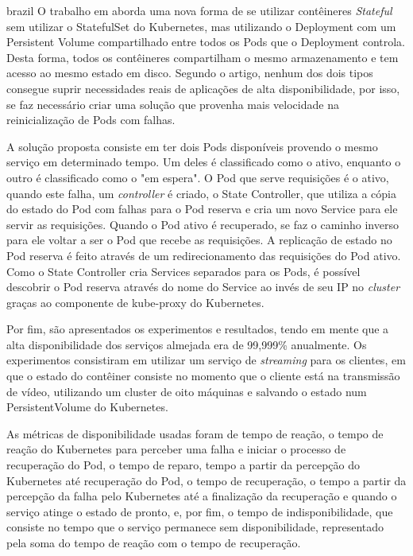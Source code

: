 \begin{otherlanguage*}{brazil}
O trabalho em \cite{vayghan2021kubernetes} aborda uma nova forma de se
utilizar contêineres \textit{Stateful} sem utilizar o StatefulSet do Kubernetes,
mas utilizando o Deployment com um Persistent Volume compartilhado entre todos
os Pods que o Deployment controla. Desta forma, todos os contêineres
compartilham o mesmo armazenamento e tem acesso ao mesmo estado em disco.
Segundo o artigo, nenhum dos dois tipos consegue suprir necessidades reais de
aplicações de alta disponibilidade, por isso, se faz necessário criar uma
solução que provenha mais velocidade na reinicialização de Pods com falhas.

A solução proposta consiste em ter dois Pods disponíveis provendo o mesmo
serviço em determinado tempo. Um deles é classificado como o ativo, enquanto
o outro é classificado como o "em espera". O Pod que serve requisições é o
ativo, quando este falha, um \textit{controller} é criado, o State Controller, que
utiliza a cópia do estado do Pod com falhas para o Pod reserva e cria um novo Service
para ele servir as requisições. Quando o Pod ativo é recuperado, se faz o caminho inverso
para ele voltar a ser o Pod que recebe as requisições. A replicação de estado no
Pod reserva é feito através de um redirecionamento das requisições do Pod ativo. Como o State
Controller cria Services separados para os Pods, é possível descobrir o Pod reserva
através do nome do Service ao invés de seu IP no \textit{cluster} graças ao componente
de kube-proxy do Kubernetes.

Por fim, são apresentados os experimentos e resultados, tendo em mente que a
alta disponibilidade dos serviços almejada era de 99,999\% anualmente. Os
experimentos consistiram em utilizar um serviço de \textit{streaming} para os
clientes, em que o estado do contêiner consiste no momento que o cliente está
na transmissão de vídeo, utilizando um cluster de oito máquinas e salvando o
estado num PersistentVolume do Kubernetes.

As métricas de disponibilidade usadas foram de tempo de reação, o tempo de
reação do Kubernetes para perceber uma falha e iniciar o processo de
recuperação do Pod, o tempo de reparo, tempo a partir da percepção do Kubernetes
até recuperação do Pod, o tempo de recuperação, o tempo a partir da percepção
da falha pelo Kubernetes até a finalização da recuperação e quando o serviço
atinge o estado de pronto, e, por fim, o tempo de indisponibilidade, que
consiste no tempo que o serviço permanece sem disponibilidade, representado
pela soma do tempo de reação com o tempo de recuperação.


\end{otherlanguage*}
